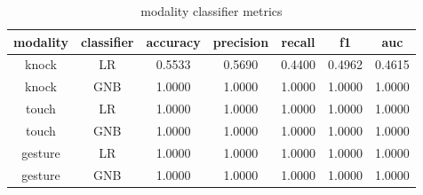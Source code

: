 \begin{table}[h]
\centering
\begin{tabular}{|c|c|c|c|c|c|c|}
\hline
modality & classifier & accuracy & precision & recall & f1 & auc \\ \hline
knock & LR & 0.5533 & 0.5690 & 0.4400 & 0.4962 & 0.4615 \\
knock & GNB & 1.0000 & 1.0000 & 1.0000 & 1.0000 & 1.0000 \\
touch & LR & 1.0000 & 1.0000 & 1.0000 & 1.0000 & 1.0000 \\
touch & GNB & 1.0000 & 1.0000 & 1.0000 & 1.0000 & 1.0000 \\
gesture & LR & 1.0000 & 1.0000 & 1.0000 & 1.0000 & 1.0000 \\
gesture & GNB & 1.0000 & 1.0000 & 1.0000 & 1.0000 & 1.0000 \\
\hline
\end{tabular}
\caption{modality classifier metrics}
\label{tab:T04}
\end{table}
